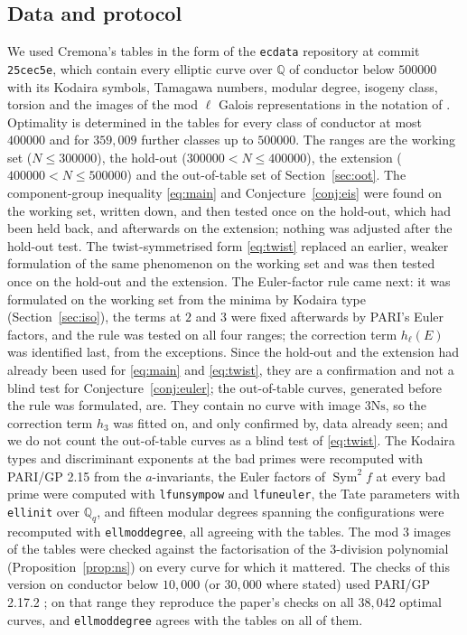 \documentclass[11pt]{amsart}
\theoremstyle{definition}
\newcommand{\Q}{\mathbb{Q}}
\newcommand{\Sym}{\operatorname{Sym}^2}
\newcommand{\Ns}{3\mathrm{Ns}}
\begin{document}
\subsection{Data and protocol}
We used Cremona's tables \cite{Cremona97} in the form of the \texttt{ecdata} repository at commit \texttt{25cec5e}, which contain every elliptic curve over $\Q$ of conductor below $500000$ with its Kodaira symbols, Tamagawa numbers, modular degree, isogeny class, torsion and the images of the mod $\ell$ Galois representations in the notation of \cite{Sutherland16}. Optimality is determined in the tables for every class of conductor at most $400000$ and for $359{,}009$ further classes up to $500000$. The ranges are the working set ($N\le300000$), the hold-out ($300000<N\le400000$), the extension ($400000<N\le500000$) and the out-of-table set of Section~\ref{sec:oot}. The component-group inequality \eqref{eq:main} and Conjecture~\ref{conj:eis} were found on the working set, written down, and then tested once on the hold-out, which had been held back, and afterwards on the extension; nothing was adjusted after the hold-out test. The twist-symmetrised form \eqref{eq:twist} replaced an earlier, weaker formulation of the same phenomenon on the working set and was then tested once on the hold-out and the extension. The Euler-factor rule came next: it was formulated on the working set from the minima by Kodaira type (Section~\ref{sec:iso}), the terms at $2$ and $3$ were fixed afterwards by PARI's Euler factors, and the rule was tested on all four ranges; the correction term $h_\ell(E)$ was identified last, from the exceptions. Since the hold-out and the extension had already been used for \eqref{eq:main} and \eqref{eq:twist}, they are a confirmation and not a blind test for Conjecture~\ref{conj:euler}; the out-of-table curves, generated before the rule was formulated, are. They contain no curve with image $\Ns$, so the correction term $h_3$ was fitted on, and only confirmed by, data already seen; and we do not count the out-of-table curves as a blind test of \eqref{eq:twist}. The Kodaira types and discriminant exponents at the bad primes were recomputed with PARI/GP 2.15 \cite{PARI} from the $a$-invariants, the Euler factors of $\Sym f$ at every bad prime were computed with \texttt{lfunsympow} and \texttt{lfuneuler}, the Tate parameters with \texttt{ellinit} over $\Q_q$, and fifteen modular degrees spanning the configurations were recomputed with \texttt{ellmoddegree}, all agreeing with the tables. The mod $3$ images of the tables were checked against the factorisation of the $3$-division polynomial (Proposition~\ref{prop:ns}) on every curve for which it mattered. The checks of this version on conductor below $10{,}000$ (or $30{,}000$ where stated) used PARI/GP 2.17.2 \cite{PARI217}; on that range they reproduce the paper's checks on all $38{,}042$ optimal curves, and \texttt{ellmoddegree} agrees with the tables on all of them.
\end{document}
